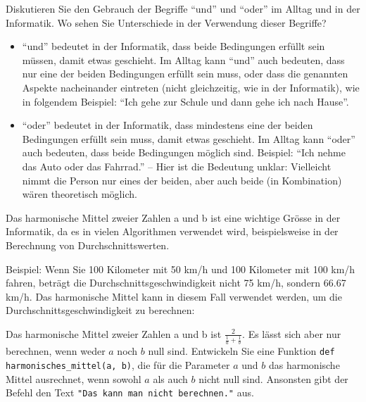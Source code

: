 \begin{mychallenge}
	Diskutieren Sie den Gebrauch der Begriffe \enquote{und} und \enquote{oder} im Alltag und in der Informatik. Wo sehen Sie Unterschiede in der Verwendung dieser Begriffe?
	\begin{myanswer}
		\begin{itemize}
			\item \enquote{und} bedeutet in der Informatik, dass beide Bedingungen erfüllt sein müssen, damit etwas geschieht. Im Alltag kann \enquote{und} auch bedeuten, dass nur eine der beiden Bedingungen erfüllt sein muss, oder dass die genannten Aspekte nacheinander eintreten (nicht gleichzeitig, wie in der Informatik), wie in folgendem Beispiel: \enquote{Ich gehe zur Schule und dann gehe ich nach Hause}.
			\item \enquote{oder} bedeutet in der Informatik, dass mindestens eine der beiden Bedingungen erfüllt sein muss, damit etwas geschieht. Im Alltag kann \enquote{oder} auch bedeuten, dass beide Bedingungen möglich sind. Beispiel: \enquote{Ich nehme das Auto oder das Fahrrad.} -- Hier ist die Bedeutung unklar: Vielleicht nimmt die Person nur eines der beiden, aber auch beide (in Kombination) wären theoretisch möglich.
		\end{itemize}
	\end{myanswer}
\end{mychallenge}

\begin{mychallenge}
	Das harmonische Mittel zweier Zahlen a und b ist eine wichtige Grösse in der Informatik, da es in vielen Algorithmen verwendet wird, beispielsweise in der Berechnung von Durchschnittswerten.

	Beispiel: Wenn Sie 100 Kilometer mit 50 km/h und 100 Kilometer mit 100 km/h fahren, beträgt die Durchschnittsgeschwindigkeit nicht 75 km/h, sondern 66.67 km/h. Das harmonische Mittel kann in diesem Fall verwendet werden, um die Durchschnittsgeschwindigkeit zu berechnen:

	Das harmonische Mittel zweier Zahlen a und b ist $\frac{2}{\frac{1}{a}+\frac{1}{b}}$. Es lässt sich aber nur berechnen, wenn weder $a$ noch $b$ null sind. Entwickeln Sie eine Funktion \lstinline|def harmonisches_mittel(a, b)|, die für die Parameter $a$ und $b$ das harmonische Mittel ausrechnet, wenn sowohl $a$ als auch $b$ nicht null sind. Ansonsten gibt der Befehl den Text \lstinline|"Das kann man nicht berechnen."| aus.

	\begin{myanswer}
		
	\end{myanswer}
\end{mychallenge}

